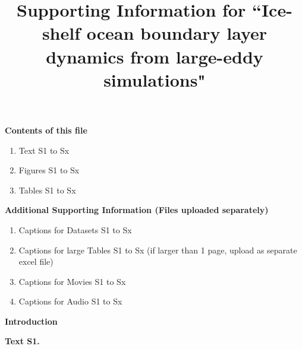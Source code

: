 \documentclass[draft,jgrga]{agutexSI2019}
\begin{document}

\title{Supporting Information for ``Ice-shelf ocean boundary layer dynamics from large-eddy simulations"}

	

\begin{article}

\noindent\textbf{Contents of this file}
\begin{enumerate}
\item Text S1 to Sx
\item Figures S1 to Sx
\item Tables S1 to Sx
\end{enumerate}
\noindent\textbf{Additional Supporting Information (Files uploaded separately)}
\begin{enumerate}
\item Captions for Datasets S1 to Sx
\item Captions for large Tables S1 to Sx (if larger than 1 page, upload as separate excel file)
\item Captions for Movies S1 to Sx
\item Captions for Audio S1 to Sx
\end{enumerate}

\noindent\textbf{Introduction}


\noindent\textbf{Text S1.}
%


\end{article}
\end{document}
